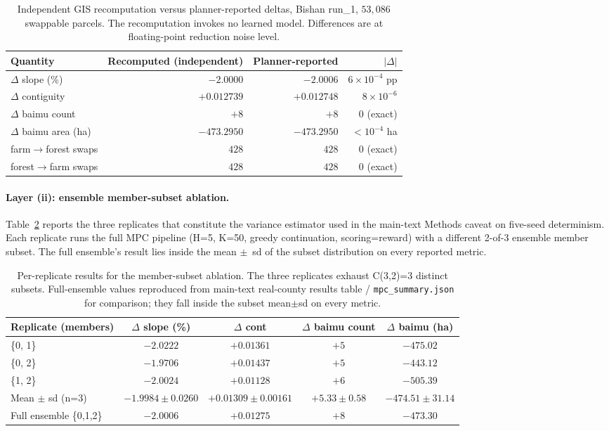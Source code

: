 \documentclass[11pt]{article}
\begin{document}
\begin{table}[htbp]
\centering
\small
\caption{Independent GIS recomputation versus planner-reported deltas, Bishan run\_1, $53{,}086$ swappable parcels. The recomputation invokes no learned model. Differences are at floating-point reduction noise level.}
\label{tab:si-validate}
\begin{tabular}{lrrr}
\toprule
Quantity & Recomputed (independent) & Planner-reported & $|\Delta|$ \\
\midrule
$\Delta$ slope (\%) & $-2.0000$ & $-2.0006$ & $6 \times 10^{-4}$ pp \\
$\Delta$ contiguity & $+0.012739$ & $+0.012748$ & $8 \times 10^{-6}$ \\
$\Delta$ baimu count & $+8$ & $+8$ & $0$ (exact) \\
$\Delta$ baimu area (ha) & $-473.2950$ & $-473.2950$ & $< 10^{-4}$ ha \\
farm$\rightarrow$forest swaps & $428$ & $428$ & $0$ (exact) \\
forest$\rightarrow$farm swaps & $428$ & $428$ & $0$ (exact) \\
\bottomrule
\end{tabular}
\end{table}

\paragraph{Layer (ii): ensemble member-subset ablation.} Table~\ref{tab:si-subset} reports the three replicates that constitute the variance estimator used in the main-text Methods caveat on five-seed determinism. Each replicate runs the full MPC pipeline (H=5, K=50, greedy continuation, scoring=reward) with a different 2-of-3 ensemble member subset. The full ensemble's result lies inside the mean $\pm$~sd of the subset distribution on every reported metric.

\begin{table}[htbp]
\centering
\small
\caption{Per-replicate results for the member-subset ablation. The three replicates exhaust C(3,2)=3 distinct subsets. Full-ensemble values reproduced from main-text real-county results table / \texttt{mpc\_summary.json} for comparison; they fall inside the subset mean$\pm$sd on every metric.}
\label{tab:si-subset}
\begin{tabular}{lcccc}
\toprule
Replicate (members) & $\Delta$ slope (\%) & $\Delta$ cont & $\Delta$ baimu count & $\Delta$ baimu (ha) \\
\midrule
\{0, 1\} & $-2.0222$ & $+0.01361$ & $+5$ & $-475.02$ \\
\{0, 2\} & $-1.9706$ & $+0.01437$ & $+5$ & $-443.12$ \\
\{1, 2\} & $-2.0024$ & $+0.01128$ & $+6$ & $-505.39$ \\
\midrule
Mean $\pm$ sd (n=3) & $-1.9984 \pm 0.0260$ & $+0.01309 \pm 0.00161$ & $+5.33 \pm 0.58$ & $-474.51 \pm 31.14$ \\
Full ensemble \{0,1,2\} & $-2.0006$ & $+0.01275$ & $+8$ & $-473.30$ \\
\bottomrule
\end{tabular}
\end{table}
\end{document}
